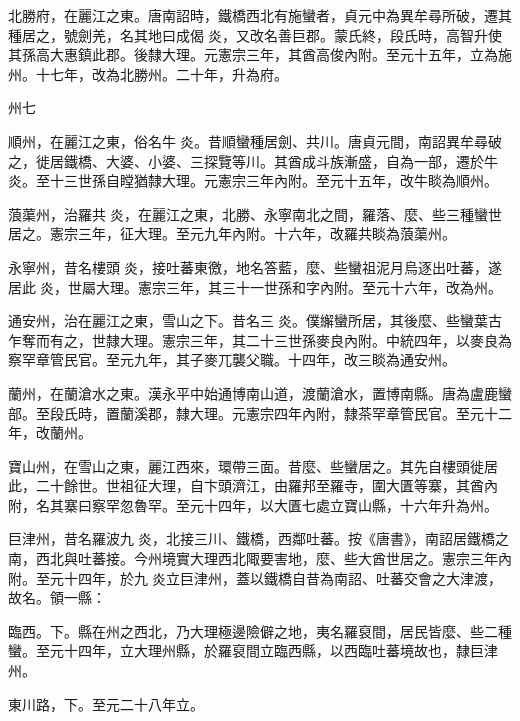 \begin{pinyinscope}
 北勝府，在麗江之東。唐南詔時，鐵橋西北有施蠻者，貞元中為異牟尋所破，遷其種居之，號劍羌，名其地曰成偈炎，又改名善巨郡。蒙氏終，段氏時，高智升使其孫高大惠鎮此郡。後隸大理。元憲宗三年，其酋高俊內附。至元十五年，立為施州。十七年，改為北勝州。二十年，升為府。



 州七



 順州，在麗江之東，俗名牛炎。昔順蠻種居劍、共川。唐貞元間，南詔異牟尋破之，徙居鐵橋、大婆、小婆、三探覽等川。其酋成斗族漸盛，自為一部，遷於牛炎。至十三世孫自瞠猶隸大理。元憲宗三年內附。至元十五年，改牛睒為順州。



 蒗蕖州，治羅共炎，在麗江之東，北勝、永寧南北之間，羅落、麼、些三種蠻世居之。憲宗三年，征大理。至元九年內附。十六年，改羅共睒為蒗蕖州。



 永寧州，昔名樓頭炎，接吐蕃東徼，地名答藍，麼、些蠻祖泥月烏逐出吐蕃，遂居此炎，世屬大理。憲宗三年，其三十一世孫和字內附。至元十六年，改為州。



 通安州，治在麗江之東，雪山之下。昔名三炎。僕繲蠻所居，其後麼、些蠻葉古乍奪而有之，世隸大理。憲宗三年，其二十三世孫麥良內附。中統四年，以麥良為察罕章管民官。至元九年，其子麥兀襲父職。十四年，改三睒為通安州。



 蘭州，在蘭滄水之東。漢永平中始通博南山道，渡蘭滄水，置博南縣。唐為盧鹿蠻部。至段氏時，置蘭溪郡，隸大理。元憲宗四年內附，隸茶罕章管民官。至元十二年，改蘭州。



 寶山州，在雪山之東，麗江西來，環帶三面。昔麼、些蠻居之。其先自樓頭徙居此，二十餘世。世祖征大理，自卞頭濟江，由羅邦至羅寺，圍大匱等寨，其酋內附，名其寨曰察罕忽魯罕。至元十四年，以大匱七處立寶山縣，十六年升為州。



 巨津州，昔名羅波九炎，北接三川、鐵橋，西鄰吐蕃。按《唐書》，南詔居鐵橋之南，西北與吐蕃接。今州境實大理西北陬要害地，麼、些大酋世居之。憲宗三年內附。至元十四年，於九炎立巨津州，蓋以鐵橋自昔為南詔、吐蕃交會之大津渡，故名。領一縣：



 臨西。下。縣在州之西北，乃大理極邊險僻之地，夷名羅裒間，居民皆麼、些二種蠻。至元十四年，立大理州縣，於羅裒間立臨西縣，以西臨吐蕃境故也，隸巨津州。



 東川路，下。至元二十八年立。




\end{pinyinscope}
